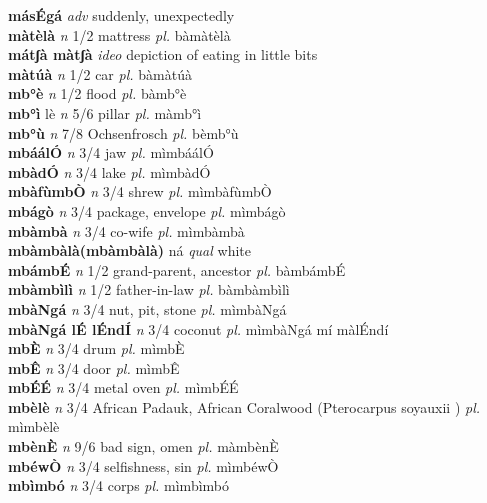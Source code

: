 \documentclass{article}
\begin{document}
{\bf másÉgá}  {\it adv} suddenly, unexpectedly         \\ 
{\bf màtèlà}  {\it n} 1/2 mattress {\it pl.} bàmàtèlà         \\ 
{\bf mátʃà màtʃà}  {\it ideo} depiction of eating in little bits         \\ 
{\bf màtúà}  {\it n} 1/2 car {\it pl.} bàmàtúà         \\ 
{\bf mb°è}  {\it n} 1/2 flood {\it pl.} bàmb°è         \\ 
{\bf mb°ì} lè {\it n} 5/6 pillar {\it pl.} màmb°ì         \\ 
{\bf mb°ù}  {\it n} 7/8 Ochsenfrosch {\it pl.} bèmb°ù         \\ 
{\bf mbáálÓ}  {\it n} 3/4 jaw {\it pl.} mìmbáálÓ         \\ 
{\bf mbàdÓ}  {\it n} 3/4 lake {\it pl.} mìmbàdÓ         \\ 
{\bf mbàfùmbÒ}  {\it n} 3/4 shrew  {\it pl.} mìmbàfùmbÒ         \\ 
{\bf mbágò}  {\it n} 3/4 package, envelope {\it pl.} mìmbágò         \\ 
{\bf mbàmbà}  {\it n} 3/4 co-wife {\it pl.} mìmbàmbà         \\ 
{\bf mbàmbàlà(mbàmbàlà)} ná {\it qual} white         \\ 
{\bf mbámbÉ}  {\it n} 1/2 grand-parent, ancestor {\it pl.} bàmbámbÉ         \\ 
{\bf mbàmbìlì}  {\it n} 1/2 father-in-law {\it pl.} bàmbàmbìlì         \\ 
{\bf mbàNgá}  {\it n} 3/4 nut, pit, stone {\it pl.} mìmbàNgá         \\ 
{\bf mbàNgá lÉ lÉndÍ}  {\it n} 3/4 coconut {\it pl.} mìmbàNgá mí màlÉndí         \\ 
{\bf mbÈ}  {\it n} 3/4 drum {\it pl.} mìmbÈ         \\ 
{\bf mbÊ}  {\it n} 3/4 door {\it pl.} mìmbÊ         \\ 
{\bf mbÉÉ}  {\it n} 3/4 metal oven {\it pl.} mìmbÉÉ         \\ 
{\bf mbèlè}  {\it n} 3/4 African Padauk, African Coralwood (Pterocarpus soyauxii ) {\it pl.} mìmbèlè         \\ 
{\bf mbènÈ}  {\it n} 9/6  bad sign, omen {\it pl.} màmbènÈ         \\ 
{\bf mbéwÒ}  {\it n} 3/4 selfishness, sin {\it pl.} mìmbéwÒ         \\ 
{\bf mbìmbó}  {\it n} 3/4 corps {\it pl.} mìmbìmbó         \\ 
\end{document}
